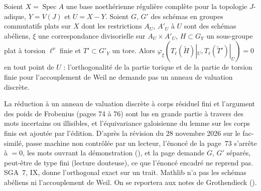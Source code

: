 \begin{encadre}
\begin{theoreme*}\nonverifie
Soient $X = \operatorname{Spec} A$ une base noethérienne régulière complète pour la topologie $J$-adique, $Y = V(J)$ et $U = X - Y$. Soient $G$, $G'$ des schémas en groupes commutatifs plats sur $X$ dont les restrictions $A_U$, $A'_U$ à $U$ sont des schémas abéliens, $\xi$ une correspondance divisorielle sur $A_U \times A'_U$, $H \subset G_Y$ un sous-groupe plat à torsion $\ell^\nu$ finie et $T' \subset G'_Y$ un tore. Alors $\varphi_\xi(T_\ell(\tilde H)|_U, T_\ell(\tilde T')|_U) = 0$ en tout point de $U$ : l'orthogonalité de la partie torique et de la partie de torsion finie pour l'accouplement de Weil ne demande pas un anneau de valuation discrète.
\end{theoreme*}
\end{encadre}
{\small La réduction à un anneau de valuation discrète à corps résiduel fini et l'argument des poids de Frobenius (pages 74 à 76) sont lus en grande partie à travers des mots incertains ou illisibles, et l'équivariance galoisienne du lemme sur les corps finis est ajoutée par l'édition. D'après la révision du 28 novembre 2026 sur le fac-similé, passe machine non contrôlée par un lecteur, l'énoncé de la page~73 s'arrête à $= 0$, les mots  ouvrant la démonstration (), et la page demande $G$, $G'$ séparés, peut-être de type fini (lecture douteuse), ce que l'énoncé encadré ne reprend pas. SGA~7, IX, donne l'orthogonal exact sur un trait. Mathlib n'a pas les schémas abéliens ni l'accouplement de Weil. On se reportera aux notes de Grothendieck ().\par}
